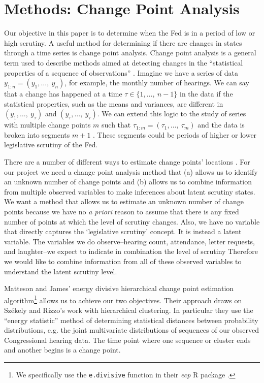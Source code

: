 \documentclass[a4paper]{article}\usepackage[]{graphicx}\usepackage[]{color}
\begin{document}
\section{Methods: Change Point Analysis}

Our objective in this paper is to determine when the Fed is in a period of low or high scrutiny. A useful method for determining if there are changes in states through a time series is change point analysis. Change point analysis is a general term used to describe methods aimed at detecting changes in the ``statistical properties of a sequence of observations'' \cite[2]{Killick2013}. Imagine we have a series of data $y_{1:n} = (y_{1},\ldots,\: y_{n})$, for example, the monthly number of hearings.  We can say that a change has happened at a time $\tau \in \{1,\ldots,\:n-1\}$ in the data if the statistical properties, such as the means and variances, are different in $(y_{1},\ldots,\: y_{\tau})$ and $(y_{\tau},\ldots,\: y_{\tau})$. We can extend this logic to the study of series with multiple change points $m$ such that $\tau_{1:m} = (\tau_{1},\ldots,\:\tau_{m})$ and the data is broken into segments $m + 1$ \citep{Killick2012,Killick2013}. These segments could be periods of higher or lower legislative scrutiny of the Fed.

There are a number of different ways to estimate change points' locations \cite[see][]{Killick2013,Matteson2012}. For our project we need a change point analysis method that (a) allows us to identify an unknown number of change points and (b) allows us to combine information from multiple observed variables to make inferences about latent scrutiny states. We want a method that allows us to estimate an unknown number of change points because we have no \emph{a priori} reason to assume that there is any fixed number of points at which the level of scrutiny changes. Also, we have no variable that directly captures the `legislative scrutiny' concept. It is instead a latent variable. The variables we do observe--hearing count, attendance, letter requests, and laughter--we expect to indicate in combination the level of scrutiny  Therefore we would like to combine information from all of these observed variables to understand the latent scrutiny level.

Matteson and James' \citeyearpar{Matteson2012,James2013} energy divisive hierarchical change point estimation algorithm\footnote{We specifically use the \texttt{e.divisive} function in their \emph{ecp} R package \citep{R-ecp}.} allows us to achieve our two objectives. Their approach draws on Sz{\'e}kely and Rizzo's \citeyearpar{Szekely2005} work with hierarchical clustering. In particular they use the ``energy statistic'' method of determining statistical distances between probability distributions, e.g. the joint multivariate distributions of sequences of our observed Congressional hearing data. The time point where one sequence or cluster ends and another begins is a change point.
\end{document}
